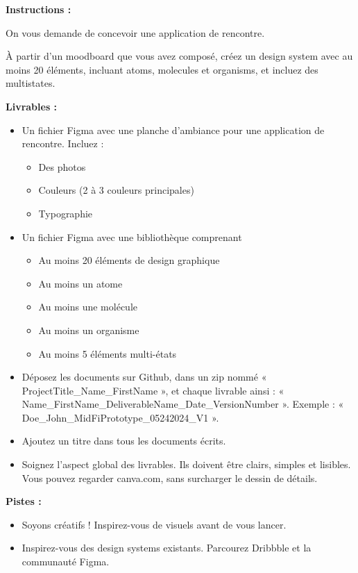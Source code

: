 \makeheaderfiles

\textbf{Instructions :}

On vous demande de concevoir une application de rencontre.

À partir d'un moodboard que vous avez composé, créez un design system avec au moins 20 éléments, incluant atoms, molecules et organisms, et incluez des multistates.

\textbf{Livrables :}

\begin{itemize}
\item Un fichier Figma avec une planche d'ambiance pour une application de rencontre. Incluez :
\begin{itemize}
\item Des photos
\item Couleurs (2 à 3 couleurs principales)
\item Typographie
\end{itemize}
\item Un fichier Figma avec une bibliothèque comprenant
\begin{itemize}
\item Au moins 20 éléments de design graphique
\item Au moins un atome
\item Au moins une molécule
\item Au moins un organisme
\item Au moins 5 éléments multi-états
\end{itemize}
\item Déposez les documents sur Github, dans un zip nommé « ProjectTitle\_Name\_FirstName », et chaque livrable ainsi : « Name\_FirstName\_DeliverableName\_Date\_VersionNumber ». Exemple : « Doe\_John\_MidFiPrototype\_05242024\_V1 ».
\item Ajoutez un titre dans tous les documents écrits.
\item Soignez l'aspect global des livrables. Ils doivent être clairs, simples et lisibles. Vous pouvez regarder canva.com, sans surcharger le dessin de détails.
\end{itemize}

\textbf{Pistes :}

\begin{itemize}
\item Soyons créatifs ! Inspirez-vous de visuels avant de vous lancer.
\item Inspirez-vous des design systems existants. Parcourez Dribbble et la communauté Figma.
\end{itemize}

